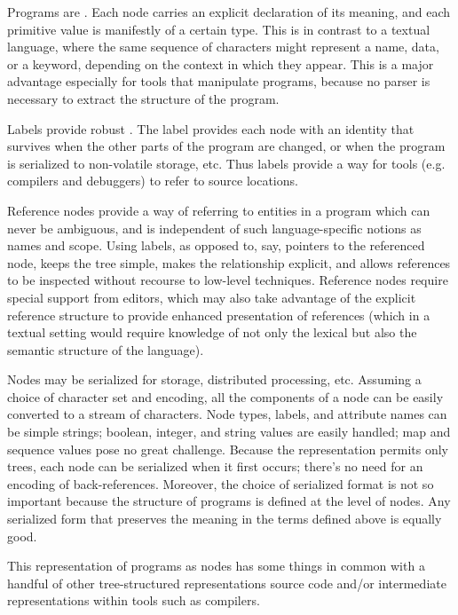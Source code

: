 Programs are . Each node carries an explicit declaration of its meaning, and each primitive value is manifestly of a certain type. This is in contrast to a textual language, where the same sequence of characters might represent a name, data, or a keyword, depending on the context in which they appear. This is a major advantage especially for tools that manipulate programs, because no parser is necessary to extract the structure of the program.

Labels provide robust . The label provides each node with an identity that survives when the other parts of the program are changed, or when the program is serialized to non-volatile storage, etc. Thus labels provide a way for tools (e.g. compilers and debuggers) to refer to source locations. 

Reference nodes provide a way of referring to entities in a program which can never be ambiguous, and is independent of such language-specific notions as names and scope. Using labels, as opposed to, say, pointers to the referenced node, keeps the tree simple, makes the relationship explicit, and allows references to be inspected without recourse to low-level techniques. Reference nodes require special support from editors, which may also take advantage of the explicit reference structure to provide enhanced presentation of references (which in a textual setting would require knowledge of not only the lexical but also the semantic structure of the language).

Nodes may be serialized for storage, distributed processing, etc. Assuming a choice of character set and encoding, all the components of a node can be easily converted to a stream of characters. Node types, labels, and attribute names can be simple strings; boolean, integer, and string values are easily handled; map and sequence values pose no great challenge. Because the representation permits only trees, each node can be serialized when it first occurs; there's no need for an encoding of back-references. Moreover, the choice of serialized format is not so important because the structure of programs is defined at the level of nodes. Any serialized form that preserves the meaning in the terms defined above is equally good.

This representation of programs as nodes has some things in common with a handful of other tree-structured representations source code and/or intermediate representations within tools such as compilers.

